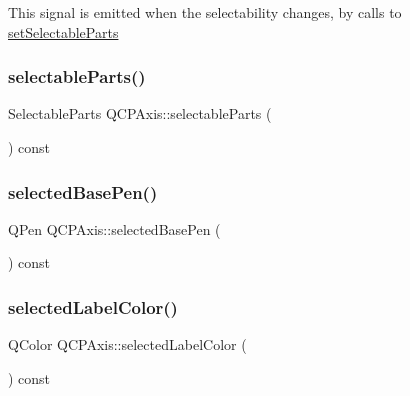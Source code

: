 This signal is emitted when the selectability changes, by calls to \mbox{\hyperlink{class_q_c_p_axis_a513f9b9e326c505d9bec54880031b085}{set\+Selectable\+Parts}} \mbox{\label{class_q_c_p_axis_a1d12d157756c114f4e57517c62177181}} 
\subsubsection{\texorpdfstring{selectableParts()}{selectableParts()}}
{\footnotesize\ttfamily Selectable\+Parts Q\+C\+P\+Axis\+::selectable\+Parts (\begin{DoxyParamCaption}{ }\end{DoxyParamCaption}) const\hspace{0.3cm}{\ttfamily [inline]}}

\mbox{\label{class_q_c_p_axis_a0d54314ab3053fd0fb77294a0e7f08cb}} 
\subsubsection{\texorpdfstring{selectedBasePen()}{selectedBasePen()}}
{\footnotesize\ttfamily Q\+Pen Q\+C\+P\+Axis\+::selected\+Base\+Pen (\begin{DoxyParamCaption}{ }\end{DoxyParamCaption}) const\hspace{0.3cm}{\ttfamily [inline]}}

\mbox{\label{class_q_c_p_axis_a7adea64ef4b715e7a1c519fff2b110b8}} 
\subsubsection{\texorpdfstring{selectedLabelColor()}{selectedLabelColor()}}
{\footnotesize\ttfamily Q\+Color Q\+C\+P\+Axis\+::selected\+Label\+Color (\begin{DoxyParamCaption}{ }\end{DoxyParamCaption}) const\hspace{0.3cm}{\ttfamily [inline]}}

